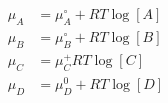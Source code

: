 \begin{eqnarray}\label{eqn:chemical-potential}
\mu_A & = \mu_A^\circ + RT\log [A] \\
\mu_B & = \mu_B^\circ + RT\log [B] \\
\mu_C & = \mu_C^ + RT\log [C] \\
\mu_D & = \mu_D^0 + RT\log [D] \\
\end{eqnarray}